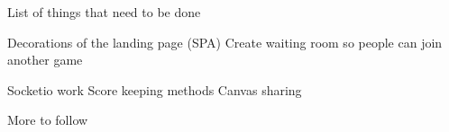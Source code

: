 List of things that need to be done

Decorations of the landing page (SPA)
Create waiting room so people can join another game

Socketio work
Score keeping methods
Canvas sharing

More to follow